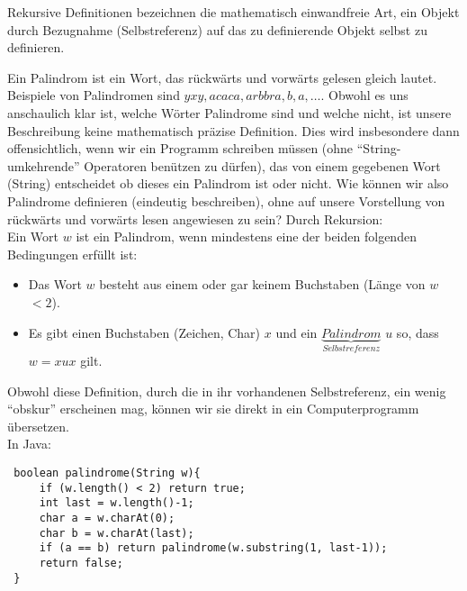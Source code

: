Rekursive Definitionen bezeichnen die mathematisch einwandfreie Art, ein Objekt durch Bezugnahme (Selbstreferenz) auf das zu definierende Objekt selbst zu definieren.

\begin{bsp}
Ein Palindrom ist ein Wort, das rückwärts und vorwärts gelesen gleich lautet. Beispiele von Palindromen sind $yxy,acaca,arbbra,b,a,\dots$. Obwohl es uns anschaulich klar ist, welche Wörter Palindrome sind und welche nicht, ist unsere Beschreibung keine mathematisch präzise Definition. Dies wird insbesondere dann offensichtlich, wenn wir ein Programm schreiben müssen (ohne ``String-umkehrende'' Operatoren benützen zu dürfen), das von einem gegebenen Wort (String) entscheidet ob dieses ein Palindrom ist oder nicht. Wie können wir also Palindrome definieren (eindeutig beschreiben), ohne auf unsere Vorstellung von rückwärts und vorwärts lesen angewiesen zu sein? Durch Rekursion:\\
Ein Wort $w$ ist ein Palindrom, wenn mindestens eine der beiden folgenden Bedingungen erfüllt ist:
\begin{itemize}
\item Das Wort $w$ besteht aus einem oder gar keinem Buchstaben (Länge von $w$ $<2$).
\item Es gibt einen Buchstaben (Zeichen, Char) $x$ und ein $\underbrace{Palindrom}_{Selbstreferenz}$ $u$ so, dass $w=xux$ gilt.
\end{itemize}
Obwohl diese Definition, durch die in ihr vorhandenen Selbstreferenz, ein wenig ``obskur'' erscheinen mag, können wir sie direkt in ein Computerprogramm übersetzen.\\
In Java:

\lstset{language=Java}
\begin{framed}
\begin{lstlisting}
 boolean palindrome(String w){
     if (w.length() < 2) return true;
     int last = w.length()-1;
     char a = w.charAt(0);
     char b = w.charAt(last);
     if (a == b) return palindrome(w.substring(1, last-1));
     return false;
 }
\end{lstlisting}
\end{framed}
\end{bsp}

